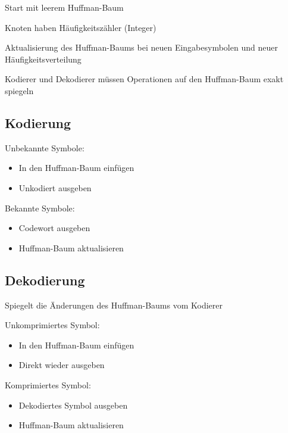 \documentclass[xcolor=dvipsnames,presentation]{beamer}    %
\newenvironment{witemize}{\itemize\setlength{\itemsep}{1em}}{\enditemize}
\begin{document}
\begin{frame}[<+->]{\insertsection}
  \begin{witemize}
  \item Start mit leerem Huffman-Baum
  \item Knoten haben Häufigkeitszähler (Integer)
  \item Aktualisierung des Huffman-Baums bei neuen Eingabesymbolen und
    neuer Häufigkeitsverteilung
  \item Kodierer und Dekodierer müssen Operationen auf den
    Huffman-Baum exakt spiegeln
  \end{witemize}
\end{frame}

\subsection{Kodierung}

\begin{frame}[<+->]{\insertsubsection}
  \begin{witemize}
  \item Unbekannte Symbole:
    \begin{itemize}
    \item In den Huffman-Baum einfügen
    \item Unkodiert ausgeben
    \end{itemize}

  \item Bekannte Symbole:
    \begin{itemize}
    \item Codewort ausgeben
    \item Huffman-Baum aktualisieren
    \end{itemize}
  \end{witemize}
\end{frame}

\subsection{Dekodierung}

\begin{frame}[<+->]{\insertsubsection}
  \begin{witemize}
  \item Spiegelt die Änderungen des Huffman-Baums vom Kodierer
  \item Unkomprimiertes Symbol:
    \begin{itemize}
      \item In den Huffman-Baum einfügen
      \item Direkt wieder ausgeben
    \end{itemize}
  \item Komprimiertes Symbol:
    \begin{itemize}
      \item Dekodiertes Symbol ausgeben
      \item Huffman-Baum aktualisieren
    \end{itemize}
  \end{witemize}
\end{frame}
\end{document}

